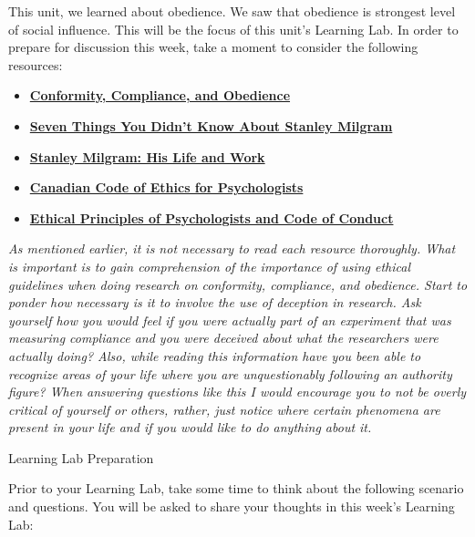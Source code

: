 \documentclass[
]{book}
\providecommand{\tightlist}{%
  \setlength{\itemsep}{0pt}\setlength{\parskip}{0pt}}
\begin{document}
\begin{reflect}
This unit, we learned about obedience. We saw that obedience is strongest level of social influence. This will be the focus of this unit's Learning Lab. In order to prepare for discussion this week, take a moment to consider the following resources:

\begin{itemize}
\tightlist
\item
  \href{https://www.units.miamioh.edu/psybersite/cults/cco.shtml}{\textbf{Conformity, Compliance, and Obedience}}\\
\item
  \href{http://blogs.discovermagazine.com/neuroskeptic/2008/12/26/seven-things-you-didnt-know-about-milgram/\#.Xc8k9vZFyP9}{\textbf{Seven Things You Didn't Know About Stanley Milgram}}\\
\item
  \href{https://www.mtholyoke.edu/~apkokot/MilgramBio.htm}{\textbf{Stanley Milgram: His Life and Work}}\\
\item
  \href{https://cpa.ca/docs/File/Ethics/CPA_Code_2017_4thEd.pdf}{\textbf{Canadian Code of Ethics for Psychologists}}\\
\item
  \href{https://www.apa.org/ethics/code/index}{\textbf{Ethical Principles of Psychologists and Code of Conduct}}
\end{itemize}

\emph{As mentioned earlier, it is not necessary to read each resource thoroughly. What is important is to gain comprehension of the importance of using ethical guidelines when doing research on conformity, compliance, and obedience. Start to ponder how necessary is it to involve the use of deception in research. Ask yourself how you would feel if you were actually part of an experiment that was measuring compliance and you were deceived about what the researchers were actually doing? Also, while reading this information have you been able to recognize areas of your life where you are unquestionably following an authority figure? When answering questions like this I would encourage you to not be overly critical of yourself or others, rather, just notice where certain phenomena are present in your life and if you would like to do anything about it.}

{Learning Lab Preparation}

Prior to your Learning Lab, take some time to think about the following scenario and questions. You will be asked to share your thoughts in this week's Learning Lab:


\end{reflect}
\end{document}
